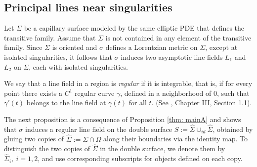 \documentclass[11pt,reqno]{amsart}
\begin{document}


\subsection{Principal lines near singularities}


Let $\Sigma$ be a capillary surface modeled by the same elliptic PDE that defines the transitive family. Assume that $\Sigma$ is not contained in any element of the transitive family. Since $\Sigma$ is oriented and $\sigma$ defines a Lorentzian metric on $\Sigma$, except at isolated singularities, it follows that $\sigma$ induces two asymptotic line fields $L_1$ and $L_2$ on $\Sigma$, each with isolated singularities.

We say that a line field in a region is \emph{regular} if it is integrable, that is, if for every point there exists a $C^1$ regular curve $\gamma$, defined in a neighborhood of $0$, such that  $\gamma'(t)$ belongs to the line field at $\gamma(t)$ for all $t$. (See \cite{Hopf1946}, Chapter III, Section 1.1).

The next proposition is a consequence of Proposition \ref{thm: mainA} and shows that $\sigma$ induces a regular line field on the double surface $S:=\widehat{\Sigma}\cup_{id}\widehat{\Sigma}$, obtained by gluing two copies of $\widehat{\Sigma}:=\Sigma\cap \Omega$ along their boundaries via the identity map. To distinguish the two copies of $\widehat{\Sigma}$ in the double surface, we denote them by $\widehat{\Sigma}_i,\ i=1,2$, and use corresponding subscripts for objects defined on each copy. %
\end{document}
